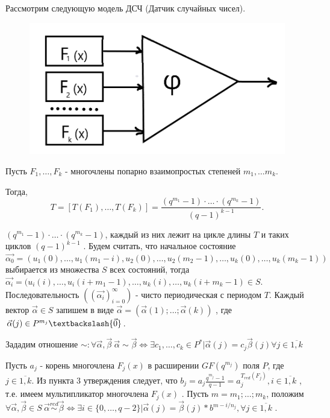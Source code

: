 Рассмотрим следующую модель ДСЧ (Датчик случайных чисел).\\

\begin{figure}[h!]
    \centering
    \includegraphics[scale=0.35]{DSC}
\end{figure}

Пусть $F_1, \dots, F_k$ - многочлены попарно взаимопростых степеней $m_1, \dots m_k$.

Тогда,
$$
T=[T(F_1), \dots, T(F_k)] = \frac{(q^{m_1} - 1) \cdot \ldots \cdot (q^{m_k} - 1)}{(q-1)^{k-1}}.
$$

$(q^{m_1} - 1) \cdot \dotsc \cdot (q^{m_k} - 1)$, каждый из них лежит на цикле длины $T$ и таких циклов $(q-1)^{k-1}$ . Будем считать, что начальное состояние $\vec{\alpha_0} = (u_1(0), \dots, u_1(m_1 - i),u_2(0),\dotsc, u_2(m_2-1), \dots, u_k(0), \dots, u_k(m_k-1))$ выбирается из множества $S$ всех состояний, тогда $\vec{\alpha_i}=(u_i(i), \dots, u_i(i+m_1-1), \dots, u_k(i), \dots, u_k(i+m_k-1) \in S$.
Последовательность $((\vec{\alpha_i})_{i=0}^{\infty})$ - чисто периодическая с периодом $T$.
Каждый вектор $\vec{\alpha} \in S$ запишем в виде $\vec{\alpha} = (\vec{\alpha}(1); \dots; \vec{\alpha}(k))$ , где $\vec{\alpha}(j) \in P^{m_j} \textbackslash \{\vec{0}\}$.

Зададим отношение $\sim : \forall \vec{\alpha}, \vec{\beta} \: \vec{\alpha}\sim\vec{\beta} \Leftrightarrow \exists c_1, \dots, c_k \in P^*|\vec{\alpha}(j) = c_j \vec{\beta}(j) \forall j \in \overline{1,k}$

Пусть $a_j$ - корень многочлена $F_j(x)$ в расширении $GF(q^{m_j})$ поля $P$, где $j \in \overline{1,k}$. Из пункта 3 утверждения следует, что $b_j = a_j \frac{q^{m_j}-1}{q-1} = a_j^{T_{red}(F_j)}, i \in \overline{1,k}$ , т.е. имеем мультипликатор многочлена $F_j(x)$ . Пусть $m=m_1; \dots; m_k$, положим $\forall \vec{\alpha}, \vec{\beta} \in S \: \vec{\alpha} \stackrel{red}{\sim} \vec{\beta} \Leftrightarrow \exists i \in \{0, \dots, q-2\} | \vec{\alpha}(j) = \vec{\beta}(j) * b^{m-i/n_j}, \forall j \in \overline{1,k}$ .

